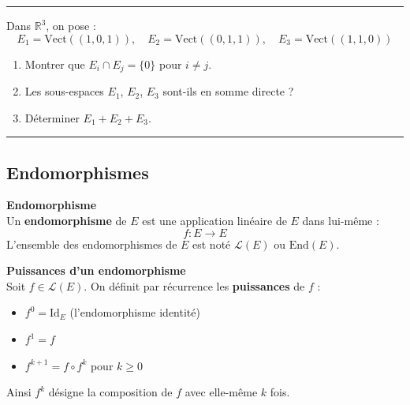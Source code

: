 \documentclass[../PolyS4.tex]{subfiles}
\begin{document}
\vspace{1em}
\hrule
\vspace{1em}


Dans $\mathbb{R}^3$, on pose :
$$E_1 = \text{Vect}((1, 0, 1)), \quad E_2 = \text{Vect}((0, 1, 1)), \quad E_3 = \text{Vect}((1, 1, 0))$$
\begin{enumerate}
    \item Montrer que $E_i \cap E_j = \{0\}$ pour $i \neq j$.
    \item Les sous-espaces $E_1$, $E_2$, $E_3$ sont-ils en somme directe ?
    \item Déterminer $E_1 + E_2 + E_3$.
\end{enumerate}

\vspace{1em}
\hrule
\vspace{1em}

\subsection{Endomorphismes}

\begin{Def}\textbf{Endomorphisme}\\

Un \textbf{endomorphisme} de $E$ est une application linéaire de $E$ dans lui-même :
$$f : E \longrightarrow E$$
L'ensemble des endomorphismes de $E$ est noté $\mathcal{L}(E)$ ou $\text{End}(E)$.
\end{Def}

\begin{Def}\textbf{Puissances d'un endomorphisme}\\

Soit $f \in \mathcal{L}(E)$. On définit par récurrence les \textbf{puissances} de $f$ :
\begin{itemize}
    \item $f^0 = \text{Id}_E$ (l'endomorphisme identité)
    \item $f^1 = f$
    \item $f^{k+1} = f \circ f^k$ pour $k \geq 0$
\end{itemize}
Ainsi $f^k$ désigne la composition de $f$ avec elle-même $k$ fois.
\end{Def}
\end{document}
